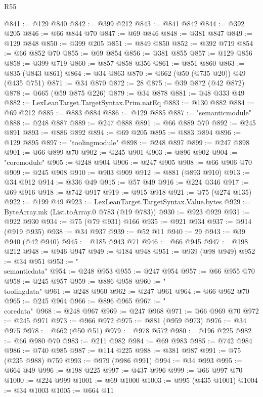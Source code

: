 \begin{lexlean}{R55}
\begin{coremodule}
{{{{{{{{{{{{{{{{{{{{{{{{{{{{{{{{{{{{{{{{{{{{{{{{{{{{{{{{{{{{{{{{{{{{{{{{{{{{{{{{@841 := @129 @840
@842 := @399 @212
@843 := @841 @842
@844 := @392 @205
@846 := @66 @844 @70
@847 := @69 @846
@848 := @381 @847
@849 := @129 @848
@850 := @399 @205
@851 := @849 @850
@852 := @392 @719
@854 := @66 @852 @70
@855 := @69 @854
@856 := @381 @855
@857 := @129 @856
@858 := @399 @719
@860 := @857 @858 @356
@861 := @851 @860
@863 := @835 (@843 @861)
@864 := @34 @863
@870 := @662 (@50 (@735 @20)) @49 (@435 @751)
@871 := @34 @870
@872 := 28
@875 := @39 @872 (@42 @872)
@878 := @665 (@59 @875 @226)
@879 := @34 @878
@881 := @48 @333 @49
@882 := LexLeanTarget.TargetSyntax.Prim.natEq
@883 := @130 @882
@884 := @69 @212
@885 := @883 @884
@886 := @129 @885
@887 := "semanticmodule"
@888 := @248 @887
@889 := @247 @888
@891 := @66 @889 @70
@892 := @245 @891
@893 := @886 @892
@894 := @69 @205
@895 := @883 @894
@896 := @129 @895
@897 := "toolingmodule"
@898 := @248 @897
@899 := @247 @898
@901 := @66 @899 @70
@902 := @245 @901
@903 := @896 @902
@904 := "coremodule"
@905 := @248 @904
@906 := @247 @905
@908 := @66 @906 @70
@909 := @245 @908
@910 := @903 @909
@912 := @881 (@893 @910)
@913 := @34 @912
@914 := @336 @49
@915 := @57 @49
@916 := @224 @346
@917 := @69 @916
@918 := @742 @917
@919 := @915 @918
@921 := @75 (@274 @135)
@922 := @199 @49
@923 := LexLeanTarget.TargetSyntax.Value.bytes
@929 := ByteArray.mk (List.toArray.{0} @783 (@19 @783))
@930 := @923 @929
@931 := @922 @930
@934 := @75 (@79 @931) @166
@935 := @921 @934
@937 := @914 (@919 @935)
@938 := @34 @937
@939 := @52 @11
@940 := 29
@943 := @39 @940 (@42 @940)
@945 := @185 @943 @71
@946 := @66 @945
@947 := @198 @212
@948 := @946 @947
@949 := @184 @948
@951 := @939 (@98 @949)
@952 := @34 @951
@953 := "\\semanticdata"
@954 := @248 @953
@955 := @247 @954
@957 := @66 @955 @70
@958 := @245 @957
@959 := @886 @958
@960 := "\\toolingdata"
@961 := @248 @960
@962 := @247 @961
@964 := @66 @962 @70
@965 := @245 @964
@966 := @896 @965
@967 := "\\coredata"
@968 := @248 @967
@969 := @247 @968
@971 := @66 @969 @70
@972 := @245 @971
@973 := @966 @972
@975 := @881 (@959 @973)
@976 := @34 @975
@978 := @662 (@50 @51)
@979 := @978 @572
@980 := @196 @225
@982 := @66 @980 @70
@983 := @211 @982
@984 := @69 @983
@985 := @742 @984
@986 := @740 @985
@987 := @114 @225
@988 := @381 @987
@991 := @75 (@235 @988) @759
@993 := @979 (@986 @991)
@994 := @34 @993
@995 := @664 @49
@996 := @198 @225
@997 := @437 @996
@999 := @66 @997 @70
@1000 := @224 @999
@1001 := @69 @1000
@1003 := @995 (@435 @1001)
@1004 := @34 @1003
@1005 := @664 @11
}}}}}}}}}}}}}}}}}}}}}}}}}}}}}}}}}}}}}}}}}}}}}}}}}}}}}}}}}}}}}}}}}}}}}}}}}}}}}}}}
\end{coremodule}
\end{lexlean}

